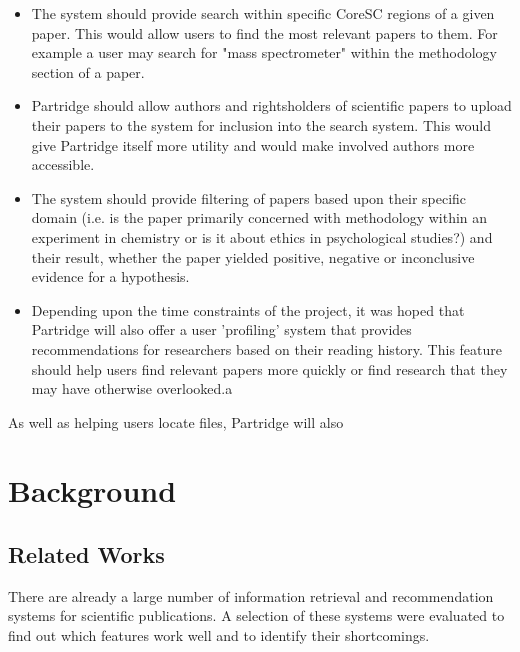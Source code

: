 \begin{itemize}
\item The system should provide search within specific CoreSC regions of a given
paper. This would allow users to find the most relevant papers to them. For
example a user may search for "mass spectrometer" within the methodology
section of a paper.
\item Partridge should allow authors and rightsholders of scientific papers to
upload their papers to the system for inclusion into the search system. This
would give Partridge itself more utility and would make involved authors more
accessible.
\item The system should provide filtering of papers based upon their
specific domain (i.e. is the paper primarily concerned with methodology within
an experiment in chemistry or is it about ethics in psychological studies?) and
their result, whether the paper yielded positive, negative or inconclusive
evidence for a hypothesis. 
\item Depending upon the time constraints of the
project, it was hoped that Partridge will also offer a user 'profiling' system
that provides recommendations for researchers based on their reading history.
This feature should help users find relevant papers more quickly or find
research that they may have otherwise overlooked.a
\end{itemize}

As well as helping users locate files, Partridge will also


\section{Background}

\subsection{ Related Works }

There are already a large number of information retrieval and recommendation
systems for scientific publications. A selection of these systems were
evaluated to find out which features work well and to identify their
shortcomings.

